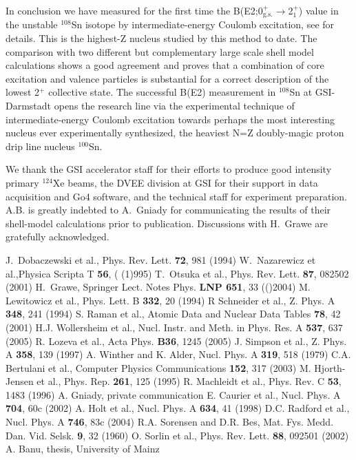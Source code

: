 \documentclass[aps,prc,twocolumn,amssymb,showpacs]{revtex4}
\def\Journal#1#2#3#4{{#1} {\bf #2}, #3 (#4)}
\def\NIMR{Nucl. Instr. and Meth. in Phys. Res. A}
\def\ADNDT{Atomic Data and Nuclear Data Tables}
\def\NPA{Nucl. Phys. A}
\def\CPC{Computer Physics Communications}
\def\PLB{Phys. Lett.  B}
\def\PRL{Phys. Rev. Lett.}
\def\PRC{Phys. Rev. C}
\def\ZPA{Z. Phys. A}
\def\Prep{Phys. Rep.}
\def\MFMDVS{Mat. Fys. Medd. Dan. Vid. Selsk.}
\def\Acta{Acta Phys.}
\begin{document}
In conclusion we have measured for the first time the
B(E2;0$^+_{\text{g.s.}}$$\rightarrow$2$^{+}_1$) value in the
unstable $^{108}$Sn isotope by intermediate-energy Coulomb
excitation, see \cite{ban05} for details. This is the highest-Z
nucleus studied by this method to date. The comparison with two
different but complementary large scale shell model calculations
shows a good agreement and proves that a combination of core
excitation and valence particles is substantial for a correct
description of the lowest 2$^+$ collective state. The successful
B(E2) measurement in $^{108}$Sn at GSI-Darmstadt opens the
research line via the experimental technique of
intermediate-energy Coulomb excitation towards perhaps the most
interesting nucleus ever experimentally synthesized, the heaviest
N=Z doubly-magic proton drip line nucleus $^{100}$Sn.

\begin{acknowledgments}
We thank the GSI accelerator staff for their efforts to produce
good intensity primary $^{124}$Xe beams, the DVEE division at GSI
for their support in data acquisition and Go4 software, and the
technical staff for experiment preparation. A.B. is greatly 
indebted to A.~Gniady for communicating the
results of their shell-model calculations prior to publication.
Discussions with H.~Grawe are gratefully acknowledged.
\end{acknowledgments}

\begin{thebibliography}{100}
 J.~Dobaczewski et al., \Journal{\PRL}{72}{981}{1994}
 W.~Nazarewicz et al.,\Journal{Physica Scripta T}{56}(1995)
 T.~Otsuka et al., \Journal{\PRL}{87}{082502}{2001}
 H.~Grawe, \Journal{Springer Lect. Notes Phys.}{LNP 651}{33}(2004)
 M. Lewitowicz et al., \Journal{\PLB}{332}{20}{1994}
 R Schneider et al., \Journal{\ZPA}{348}{241}{1994}
 S. Raman et al., \Journal{\ADNDT}{78}{42}{2001}
 H.J. Wollersheim et al., \Journal{\NIMR}{537}{637}{2005}
 R. Lozeva et al., \Journal{\Acta} {B36}{1245}{2005}
 J. Simpson et al., \Journal{\ZPA}{358}{139}{1997}
 A. Winther and K. Alder, \Journal{\NPA}{319}{518}{1979}
 C.A. Bertulani et al., \Journal{\CPC}{152}{317}{2003}
 M. Hjorth-Jensen et al., \Journal{\Prep}{261}{125}{1995}
 R. Machleidt et al., \Journal{\PRC}{53}{1483}{1996}
 A. Gniady, private communication
 E. Caurier et al., \Journal{\NPA}{704}{60c}{2002}
 A. Holt et al., \Journal{\NPA}{634}{41}{1998}
 D.C. Radford et al., \Journal{\NPA}{746}{83c}{2004}
 R.A. Sorensen and D.R. Bes, \Journal{\MFMDVS}{9}{32}{1960}
 O. Sorlin et al., \Journal{\PRL}{88}{092501}{2002}
 A. Banu, thesis, University of Mainz
\end{thebibliography}
\end{document}
